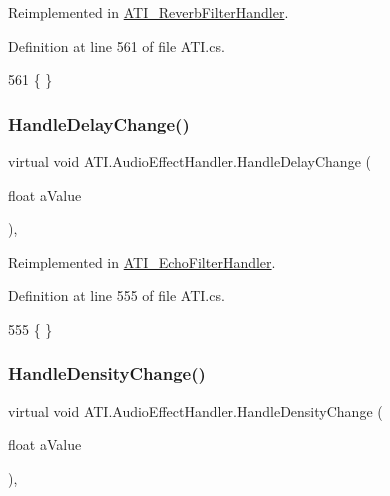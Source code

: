 Reimplemented in \hyperlink{class_a_t_i___reverb_filter_handler_a30a45fb9d8bbd7e10054eaa4595666b3}{A\+T\+I\+\_\+\+Reverb\+Filter\+Handler}.



Definition at line 561 of file A\+T\+I.\+cs.


\begin{DoxyCode}
561 \{ \}
\end{DoxyCode}
\mbox{\label{class_a_t_i_1_1_audio_effect_handler_a5371fca4c2e86cecfc264dfc7559b6bd}} 
\subsubsection{\texorpdfstring{Handle\+Delay\+Change()}{HandleDelayChange()}}
{\footnotesize\ttfamily virtual void A\+T\+I.\+Audio\+Effect\+Handler.\+Handle\+Delay\+Change (\begin{DoxyParamCaption}\item[{float}]{a\+Value }\end{DoxyParamCaption})\hspace{0.3cm}{\ttfamily [protected]}, {\ttfamily [virtual]}}



Reimplemented in \hyperlink{class_a_t_i___echo_filter_handler_a33447b03218ff2945e5f8cea0f8f0d45}{A\+T\+I\+\_\+\+Echo\+Filter\+Handler}.



Definition at line 555 of file A\+T\+I.\+cs.


\begin{DoxyCode}
555 \{ \}
\end{DoxyCode}
\mbox{\label{class_a_t_i_1_1_audio_effect_handler_acdbfbd384e2fdb5bd43ad977e264500a}} 
\subsubsection{\texorpdfstring{Handle\+Density\+Change()}{HandleDensityChange()}}
{\footnotesize\ttfamily virtual void A\+T\+I.\+Audio\+Effect\+Handler.\+Handle\+Density\+Change (\begin{DoxyParamCaption}\item[{float}]{a\+Value }\end{DoxyParamCaption})\hspace{0.3cm}{\ttfamily [protected]}, {\ttfamily [virtual]}}



